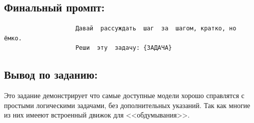 \subsection{Финальный промпт:}
\begin{verbatim}
					Давай  рассуждать  шаг  за  шагом, кратко, но ёмко.
					Реши  эту  задачу: {ЗАДАЧА}
\end{verbatim}
\subsection{Вывод по заданию:}
\indent Это задание демонстрирует что самые доступные модели хорошо справлятся с простыми логическими задачами, без дополнительных указаний. Так как многие из них имееют встроенный движок для <<обдумывания>>. 